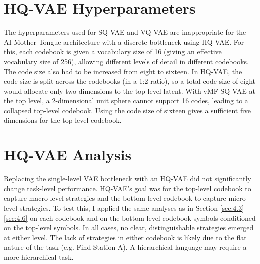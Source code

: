\section{HQ-VAE Hyperparameters}
\label{sec:hq-2}

The hyperparameters used for SQ-VAE and VQ-VAE are inappropriate for the AI Mother Tongue architecture with a discrete bottleneck using HQ-VAE.
For this, each codebook is given a vocabulary size of 16 (giving an effective vocabulary size of 256), allowing different levels of detail in different codebooks.
The code size also had to be increased from eight to sixteen.
In HQ-VAE, the code size is split across the codebooks (in a 1:2 ratio), so a total code size of eight would allocate only two dimensions to the top-level latent. 
With vMF SQ-VAE at the top level, a 2-dimensional unit sphere cannot support 16 codes, leading to a collapsed top-level codebook.
Using the code size of sixteen gives a sufficient five dimensions for the top-level codebook.


\section{HQ-VAE Analysis}
\label{sec:hq-3}

Replacing the single-level VAE bottleneck with an HQ-VAE did not significantly change task-level performance.
HQ-VAE's goal was for the top-level codebook to capture macro-level strategies and the bottom-level codebook to capture micro-level strategies.
To test this, I applied the same analyses as in Section \ref{sec:4.3} - \ref{sec:4.6} on each codebook and on the bottom-level codebook symbols conditioned on the top-level symbols.
In all cases, no clear, distinguishable strategies emerged at either level.
The lack of strategies in either codebook is likely due to the flat nature of the task (e.g. Find Station A).
A hierarchical language may require a more hierarchical task.